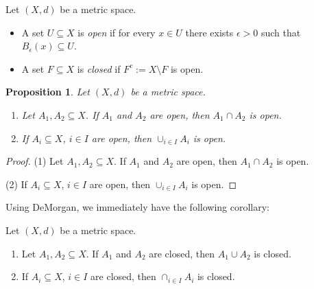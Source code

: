 \documentclass [aspectratio=169]{beamer}
\newtheorem{proposition}[theorem]{Proposition}
\begin{document}
\begin{frame}
\begin{definition}
Let $(X,d)$ be a metric space. 
\begin{itemize}
    \item A set $U \subseteq X$ is \emph{open} if for every $x \in U$ there exists $\epsilon>0$ such that $B_\epsilon(x) \subseteq U$.
    \item A set $F \subseteq X$ is \emph{closed} if $F^c:= X\setminus F$ is open.
\end{itemize}
\end{definition}

\vspace{1.5cm}

\begin{proposition}
Let $(X,d)$ be a metric space. 
 \begin{enumerate}
     \item Let $A_1,A_2\subseteq X$. If $A_1$ and $A_2$ are open, then $A_1 \cap A_2$ is open.
     \item If $A_i \subseteq X$, $i \in I$ are open, then $\cup_{i\in I} A_i$ is open.
 \end{enumerate}
\end{proposition}

\end{frame}


\begin{frame}
\begin{proof}
(1) Let $A_1,A_2\subseteq X$. If $A_1$ and $A_2$ are open, then $A_1 \cap A_2$ is open.

\vspace{3cm}

(2) If $A_i \subseteq X$, $i \in I$ are open, then $\cup_{i\in I} A_i$ is open.

\vspace{2.5cm}

\end{proof}
\end{frame}


\begin{frame}
Using DeMorgan, we immediately have the following corollary:
\begin{corollary}
Let $(X,d)$ be a metric space. 
 \begin{enumerate}
     \item Let $A_1,A_2\subseteq X$. If $A_1$ and $A_2$ are closed, then $A_1 \cup A_2$ is closed.
     \item If $A_i \subseteq X$, $i \in I$ are closed, then $\cap_{i\in I} A_i$ is closed.
 \end{enumerate}
\end{corollary}

\end{frame}
\end{document}
